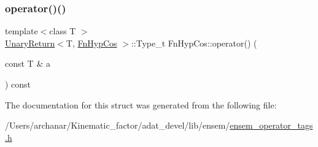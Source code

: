 \mbox{\label{structFnHypCos_ab6e05ff6650f0719ca08b86905fba763}} 
\subsubsection{\texorpdfstring{operator()()}{operator()()}\hspace{0.1cm}{\footnotesize\ttfamily [2/2]}}
{\footnotesize\ttfamily template$<$class T $>$ \\
\mbox{\hyperlink{structUnaryReturn}{Unary\+Return}}$<$T, \mbox{\hyperlink{structFnHypCos}{Fn\+Hyp\+Cos}} $>$\+::Type\+\_\+t Fn\+Hyp\+Cos\+::operator() (\begin{DoxyParamCaption}\item[{const T \&}]{a }\end{DoxyParamCaption}) const\hspace{0.3cm}{\ttfamily [inline]}}



The documentation for this struct was generated from the following file\+:\begin{DoxyCompactItemize}
\item 
/\+Users/archanar/\+Kinematic\+\_\+factor/adat\+\_\+devel/lib/ensem/\mbox{\hyperlink{lib_2ensem_2ensem__operator__tags_8h}{ensem\+\_\+operator\+\_\+tags.\+h}}\end{DoxyCompactItemize}
